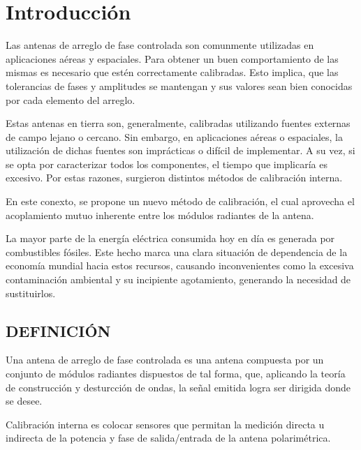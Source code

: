 
\chapter{Introducción} %

\label{ch:introduccion} %

Las antenas de arreglo de fase controlada son comunmente utilizadas en aplicaciones aéreas y espaciales. Para obtener un buen comportamiento 
de las mismas es necesario que estén correctamente calibradas. Esto implica, que las tolerancias de fases y amplitudes se mantengan y sus 
valores sean bien conocidas por cada elemento del arreglo.
 
Estas antenas en tierra son, generalmente, calibradas utilizando fuentes externas de campo lejano o cercano. Sin embargo, en aplicaciones 
aéreas o espaciales, la utilización de dichas fuentes son imprácticas o difícil de implementar. A su vez, si se opta por caracterizar todos
los componentes, el tiempo que implicaría es excesivo. Por estas razones, surgieron distintos métodos de calibración interna.

En este conexto, se propone un nuevo método de calibración, el cual aprovecha el acoplamiento mutuo inherente entre los módulos radiantes de
la antena.

La mayor parte de la energía eléctrica consumida hoy en día es generada por combustibles fósiles. Este hecho marca una clara situación
de dependencia de la economía mundial hacia estos recursos, causando inconvenientes como la excesiva
contaminación ambiental y su incipiente agotamiento, generando la necesidad de sustituirlos.

\section{DEFINICIÓN}
    
Una antena de arreglo de fase controlada es una antena compuesta por un conjunto de módulos radiantes dispuestos de tal forma, que, aplicando 
la teoría de construcción y desturcción de ondas, la señal emitida logra ser dirigida donde se desee.
    
Calibración interna es colocar sensores que permitan la medición directa u indirecta de la potencia y fase de salida/entrada de la antena 
polarimétrica.
    
